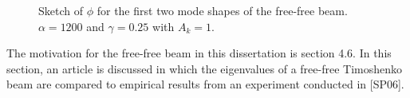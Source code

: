 \documentclass[../../main.tex]{subfiles}
\begin{document}
\begin{figure}[h!]
	
	
	\caption{Sketch of $\phi$ for the first two mode shapes of the free-free beam. $\alpha = 1200$ and $\gamma = 0.25$ with $A_k = 1$.}
\end{figure}
\FloatBarrier

The motivation for the free-free beam in this dissertation is section 4.6. In this section, an article is discussed in which the eigenvalues of a free-free Timoshenko beam are compared to empirical results from an experiment conducted in [SP06].
\end{document}
